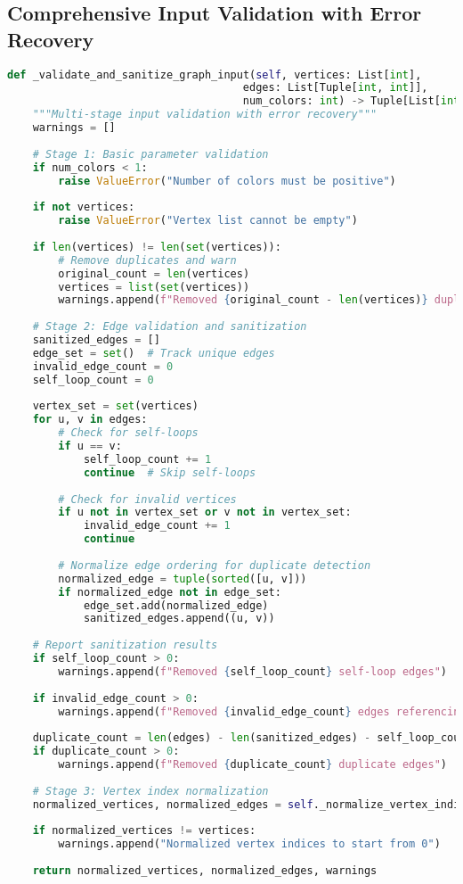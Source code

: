 \subsection{Comprehensive Input Validation with Error Recovery}
\label{appendix:input-validation}

\begin{lstlisting}[language=Python, caption=Comprehensive Input Validation with Error Recovery]
def _validate_and_sanitize_graph_input(self, vertices: List[int], 
                                     edges: List[Tuple[int, int]], 
                                     num_colors: int) -> Tuple[List[int], List[Tuple[int, int]], List[str]]:
    """Multi-stage input validation with error recovery"""
    warnings = []
    
    # Stage 1: Basic parameter validation
    if num_colors < 1:
        raise ValueError("Number of colors must be positive")
    
    if not vertices:
        raise ValueError("Vertex list cannot be empty")
    
    if len(vertices) != len(set(vertices)):
        # Remove duplicates and warn
        original_count = len(vertices)
        vertices = list(set(vertices))
        warnings.append(f"Removed {original_count - len(vertices)} duplicate vertices")
    
    # Stage 2: Edge validation and sanitization
    sanitized_edges = []
    edge_set = set()  # Track unique edges
    invalid_edge_count = 0
    self_loop_count = 0
    
    vertex_set = set(vertices)
    for u, v in edges:
        # Check for self-loops
        if u == v:
            self_loop_count += 1
            continue  # Skip self-loops
        
        # Check for invalid vertices
        if u not in vertex_set or v not in vertex_set:
            invalid_edge_count += 1
            continue
        
        # Normalize edge ordering for duplicate detection
        normalized_edge = tuple(sorted([u, v]))
        if normalized_edge not in edge_set:
            edge_set.add(normalized_edge)
            sanitized_edges.append((u, v))
    
    # Report sanitization results
    if self_loop_count > 0:
        warnings.append(f"Removed {self_loop_count} self-loop edges")
    
    if invalid_edge_count > 0:
        warnings.append(f"Removed {invalid_edge_count} edges referencing non-existent vertices")
    
    duplicate_count = len(edges) - len(sanitized_edges) - self_loop_count - invalid_edge_count
    if duplicate_count > 0:
        warnings.append(f"Removed {duplicate_count} duplicate edges")
    
    # Stage 3: Vertex index normalization
    normalized_vertices, normalized_edges = self._normalize_vertex_indices(vertices, sanitized_edges)
    
    if normalized_vertices != vertices:
        warnings.append("Normalized vertex indices to start from 0")
    
    return normalized_vertices, normalized_edges, warnings
\end{lstlisting}

